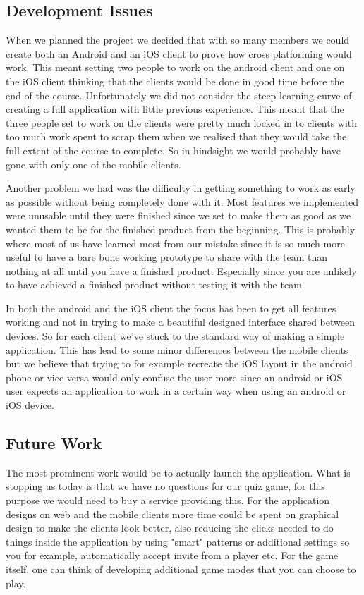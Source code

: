 \subsection{Development Issues}
When we planned the project we decided that with so many members we could create both an Android and an iOS client to prove how cross platforming would work. This meant setting two people to work on the android client and one on the iOS client thinking that the clients would be done in good time before the end of the course. Unfortunately we did not consider the steep learning curve of creating a full application with little previous experience. This meant that the three people set to work on the clients were pretty much locked in to clients with too much work spent to scrap them when we realised that they would take the full extent of the course to complete. So in hindsight we would probably have gone with only one of the mobile clients. 

Another problem we had was the difficulty in getting something to work as early as possible without being completely done with it. Most features we implemented were unusable until they were finished since we set to make them as good as we wanted them to be for the finished product from the beginning. This is probably where most of us have learned most from our mistake since it is so much more useful to have a bare bone working prototype to share with the team than nothing at all until you have a finished product. Especially since you are unlikely to have achieved a finished product without testing it with the team. 

In both the android and the iOS client the focus has been to get all features working and not in trying to make a beautiful designed interface shared between devices. So for each client we've stuck to the standard way of making a simple application. This has lead to some minor differences between the mobile clients but we believe that trying to for example recreate the iOS layout in the android phone or vice versa would only confuse the user more since an android or iOS user expects an application to work in a certain way when using an android or iOS device. 
\subsection{Future Work}
The most prominent work would be to actually launch the application. What is stopping us today is that we have no questions for our quiz game, for this purpose we would need to buy a service providing this.
For the application designs on web and the mobile clients more time could be spent on graphical design to make the clients look better, also reducing the clicks needed to do things inside the application by using "smart" patterns or additional settings so you for example, automatically accept invite from a player etc.
For the game itself, one can think of developing additional game modes that you can choose to play.
